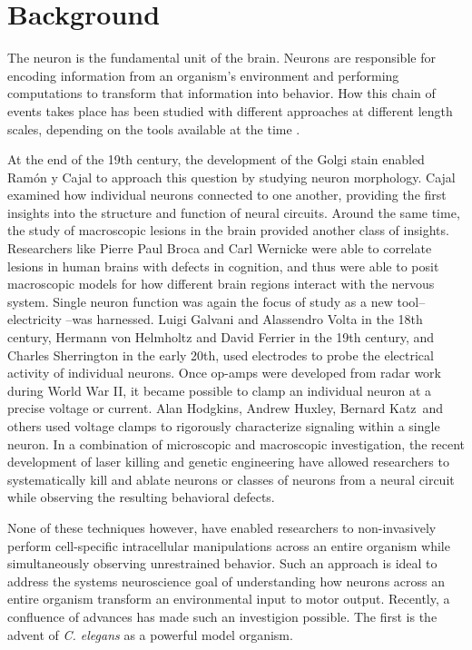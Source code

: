 \section{Background}
The neuron is the fundamental unit of the brain.  Neurons are responsible for encoding information from an organism's environment and performing computations to transform that information into  behavior.  How this chain of events takes place has been studied with different approaches at different length scales, depending on the tools available at the time \citep{finger_origins_2001, kandel_essentials_1995}.

At the end of the 19th century, the development of the Golgi stain enabled Ram\'on y Cajal to approach this question by studying neuron morphology.  Cajal examined how individual neurons connected to one another, providing the first insights into the structure and function of neural circuits. Around the same time, the study of macroscopic  lesions in the brain provided another class of insights. Researchers like Pierre Paul Broca and Carl Wernicke were able to correlate lesions in human brains with defects in cognition, and thus were able to posit macroscopic models for how different brain regions interact with the nervous system. Single neuron function was again the focus of study as a new tool-- electricity --was harnessed.  Luigi Galvani and Alassendro Volta in the 18th century, Hermann von Helmholtz and David Ferrier in the 19th century, and Charles Sherrington in the early 20th, used electrodes to probe the electrical activity of individual neurons. Once  op-amps were developed from radar work during  World War II, it became possible to clamp an individual neuron at a precise voltage or current. Alan Hodgkins, Andrew Huxley, Bernard Katz and others used voltage clamps to rigorously characterize signaling within a single neuron. In a combination of microscopic and macroscopic investigation, the recent development of laser killing and genetic engineering have allowed researchers to systematically kill and ablate neurons or classes of neurons from a neural circuit while observing the resulting behavioral defects. 

None of these techniques however, have enabled researchers to non-invasively perform cell-specific intracellular manipulations  across an entire organism while simultaneously observing unrestrained behavior.  Such an approach is ideal to address the systems neuroscience goal of understanding how neurons across an entire  organism  transform an environmental input to motor output.  Recently, a confluence of advances has made such an investigion possible. The first is the advent of \textit{C. elegans} as a powerful model organism.

